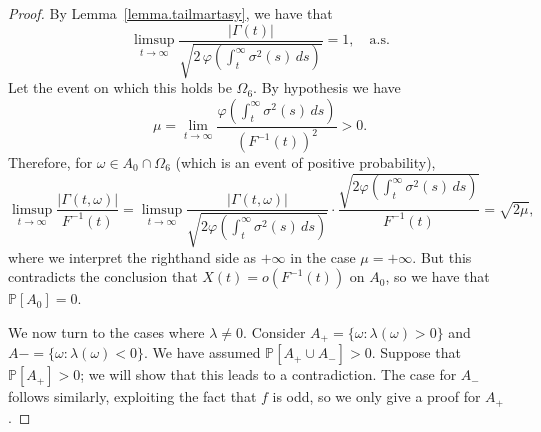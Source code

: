 \documentclass[a4paper,10pt,reqno]{amsart}
\numberwithin{equation}{section}
\theoremstyle{definition}
\theoremstyle{remark}
\DeclareMathOperator{\1}{\mathbbm 1}
\begin{document}
\begin{proof}
		By Lemma~\ref{lemma.tailmartasy}, we have that
		\[
		\limsup_{t \to \infty} 
		\frac{|\Gamma(t)|}{\sqrt{2 \, \varphi\!\left(\int_t^\infty \sigma^2(s)\, ds\right)}} 
		= 1, 
		\quad \text{a.s.}
		\]
		Let the event on which this holds be $\Omega_6$. By hypothesis we have  
		\[
		\mu = \lim_{t \to \infty} \frac{\varphi\!\left(\int_t^\infty \sigma^2(s)\, ds \right)}{(F^{-1}(t))^2} > 0.
		\]
		Therefore, for $\omega \in A_0 \cap \Omega_6$ (which is an event of positive probability),
		\[
		\limsup_{t \to \infty} \frac{|\Gamma(t,\omega)|}{F^{-1}(t)}
		= \limsup_{t \to \infty} \frac{|\Gamma(t,\omega)|}
		{\sqrt{2 \varphi\!\left(\int_t^\infty \sigma^2(s)\, ds\right)}} 
		\cdot
		\frac{\sqrt{2 \varphi\!\left(\int_t^\infty \sigma^2(s)\, ds\right)}}{F^{-1}(t)}=\sqrt{2\mu},
		\]
		where we interpret the righthand side as $+\infty$ in the case $\mu=+\infty$. But this contradicts the conclusion that $X(t)=o(F^{-1}(t))$ on $A_0$, so we have that $\mathbb{P}[A_0]=0$. 
		
		We now turn to the cases where $\lambda\neq 0$. Consider $A_+=\{\omega:\lambda(\omega)>0\}$ and $A-=\{ \omega:\lambda(\omega)<0\}$. We have assumed $\mathbb{P}[A_+\cup A_-]>0$. Suppose that $\mathbb{P}[A_+]>0$; we will show that this leads to a contradiction. The case for $A_-$ follows similarly, exploiting the fact that $f$ is odd, so we only give a proof for $A_+$. 
		

\end{proof}
\end{document}
